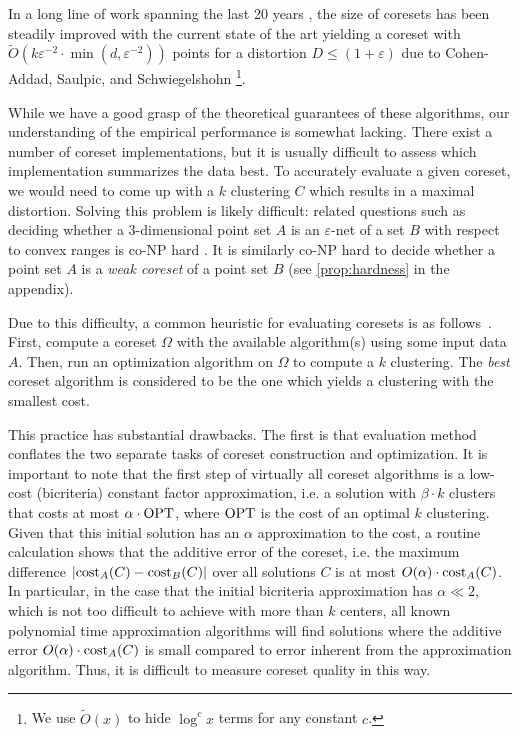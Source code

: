 In a long line of work spanning the last 20 years \cite{BecchettiBC0S19,BravermanJKW21,Chen09,FL11,FeldmanSS20,
HaM04,HaK07,huang2020coresets,BravermanJKW21,LS10,SohlerW18}, the size of coresets has been steadily improved with the current state of the art yielding a coreset with $\tilde{O}(k \varepsilon^{-2} \cdot \min(d,\varepsilon^{-2}))$ points for a distortion $D\leq (1+\varepsilon)$ due to Cohen-Addad, Saulpic, and Schwiegelshohn \cite{Cohen-AddadSS21}\footnote{We use $\tilde O(x)$ to hide $\log^c x$ terms for any constant $c$.}.

While we have a good grasp of the theoretical guarantees of these algorithms, our understanding of the empirical performance is somewhat lacking. There exist a number of coreset implementations, but it is usually difficult to assess which implementation summarizes the data best. To accurately evaluate a given coreset, we would need to come up with a $k$ clustering $C$ which results in a maximal distortion. Solving this problem is likely difficult: related questions such as deciding whether a 3-dimensional point set $A$ is an $\varepsilon$-net of a set $B$ with respect to convex ranges is co-NP hard \cite{GiannopoulosKWW12}. It is similarly co-NP hard to decide whether a point set $A$ is a \emph{weak coreset} of a point set $B$ (see \cref{prop:hardness} in the appendix). 

Due to this difficulty, a common heuristic for evaluating coresets is as follows~\cite{AckermannMRSLS12,FGSSS13}. First, compute a coreset $\Omega$ with the available algorithm(s) using some input data $A$. Then, run an optimization algorithm on $\Omega$ to compute a $k$ clustering. The \emph{best} coreset algorithm is considered to be the one which yields a clustering with the smallest cost.

This practice has substantial drawbacks.
The first is that evaluation method conflates the two separate tasks of coreset construction and optimization.
It is important to note that the first step of virtually all coreset algorithms is a low-cost (bicriteria) constant factor approximation, i.e. a solution with $\beta\cdot k$ clusters that costs at most $\alpha\cdot \text{OPT}$, where $\text{OPT}$ is the cost of an optimal $k$ clustering.
Given that this initial solution has an $\alpha$ approximation to the cost, a routine calculation shows that the additive error of the coreset, i.e. the maximum difference
$ \left\vert \text{cost}_A(C) - \text{cost}_B(C) \right\vert $
over all solutions $C$ is at most $O(\alpha)\cdot \text{cost}_A(C)$. In particular, in the case that the initial bicriteria approximation has $\alpha \ll 2$, which is not too difficult to achieve with more than $k$ centers, all known polynomial time approximation algorithms will find solutions where the additive error $O(\alpha)\cdot \text{cost}_A(C)$ is small compared to error inherent from the approximation algorithm. Thus, it is difficult to measure coreset quality in this way. 

